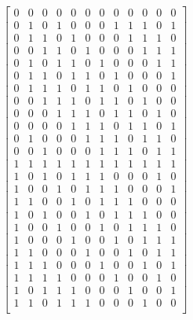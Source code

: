 \documentclass{article}
\begin{document}
\[
\begin{bmatrix}
0&0&0&0&0&0&0&0&0&0&0&0\\
0&1&0&1&0&0&0&1&1&1&0&1\\
0&1&1&0&1&0&0&0&1&1&1&0\\
0&0&1&1&0&1&0&0&0&1&1&1\\
0&1&0&1&1&0&1&0&0&0&1&1\\
0&1&1&0&1&1&0&1&0&0&0&1\\
0&1&1&1&0&1&1&0&1&0&0&0\\
0&0&1&1&1&0&1&1&0&1&0&0\\
0&0&0&1&1&1&0&1&1&0&1&0\\
0&0&0&0&1&1&1&0&1&1&0&1\\
0&1&0&0&0&1&1&1&0&1&1&0\\
0&0&1&0&0&0&1&1&1&0&1&1\\
1&1&1&1&1&1&1&1&1&1&1&1\\
1&0&1&0&1&1&1&0&0&0&1&0\\
1&0&0&1&0&1&1&1&0&0&0&1\\
1&1&0&0&1&0&1&1&1&0&0&0\\
1&0&1&0&0&1&0&1&1&1&0&0\\
1&0&0&1&0&0&1&0&1&1&1&0\\
1&0&0&0&1&0&0&1&0&1&1&1\\
1&1&0&0&0&1&0&0&1&0&1&1\\
1&1&1&0&0&0&1&0&0&1&0&1\\
1&1&1&1&0&0&0&1&0&0&1&0\\
1&0&1&1&1&0&0&0&1&0&0&1\\
1&1&0&1&1&1&0&0&0&1&0&0\\
\end{bmatrix}
\]
\end{document}

